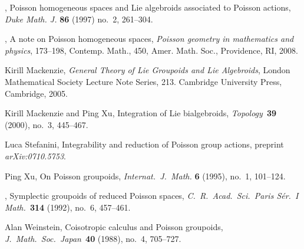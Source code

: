 \documentclass[a4paper,11pt]{amsart}
\theoremstyle{definition}
\theoremstyle{remark}
\begin{document}
\begin{thebibliography}{10}
    \bysame,
    Poisson homogeneous spaces and Lie algebroids associated to Poisson actions,
    \emph{Duke Math. J.} \textbf{86} (1997) no.~2, 261--304.

    \bysame,
    A note on Poisson homogeneous spaces,
    \emph{Poisson geometry in mathematics and physics},
    173--198, Contemp. Math., 450, Amer. Math. Soc., Providence, RI, 2008.

    Kirill Mackenzie,
    \emph{General Theory of Lie Groupoids and Lie Algebroids},
    London Mathematical Society Lecture Note Series, 213.
    Cambridge University Press, Cambridge, 2005.

    Kirill Mackenzie and Ping Xu,
    Integration of Lie bialgebroids,
    \emph{Topology~}\textbf{39} (2000),  no.~3, 445--467.

    Luca Stefanini, Integrability and reduction of Poisson group actions,
    preprint \emph{arXiv:0710.5753}.

    Ping Xu,
    On Poisson groupoids,
    \emph{Internat.~J.~Math. }\textbf{6} (1995), no.~1, 101--124.

    \bysame,
    Symplectic groupoids of reduced Poisson spaces,
    \emph{C.~R.~Acad.~Sci.~Paris S\'er.~I Math.~}\textbf{314} (1992), no.~\textsc{}6, 457--461.

    Alan Weinstein,
    Coisotropic calculus and Poisson groupoids,
    \emph{J.~Math.~Soc.~Japan~}\textbf{40} (1988), no.~4, 705--727.
\end{thebibliography}
\end{document}

